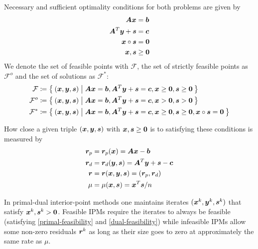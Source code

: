 Necessary and sufficient optimality conditions for both problems are given by
\begin{subequations} \label{optimality-conditions}
  \begin{align}
    \bm{A} \bm{x} &= \bm{b} \label{primal-feasibility} \\
    \bm{A}^T \bm{y} + \bm{s} &= \bm{c} \label{dual-feasibility} \\
    \bm{x} \circ \bm{s} &= \bm{0} \label{complementarity} \\
    \bm{x}, \bm{s} &\geq \bm{0} \label{nonnegativity}
  \end{align}
\end{subequations}
We denote the set of feasible points with \(\mathcal{F}\), the set of strictly feasible points as \(\mathcal{F}^o\) and the set of solutions as \(\mathcal{F}^*\):
\begin{align}
  \mathcal{F} &\coloneqq \Set{ (\bm{x}, \bm{y}, \bm{s}) | \bm{A}\bm{x} = \bm{b}, \bm{A}^T \bm{y} + \bm{s} = \bm{c}, \bm{x} \geq \bm{0}, \bm{s} \geq \bm{0}} \\
  \mathcal{F}^o &\coloneqq \Set{ (\bm{x}, \bm{y}, \bm{s}) | \bm{A}\bm{x} = \bm{b}, \bm{A}^T \bm{y} + \bm{s} = \bm{c}, \bm{x} > \bm{0}, \bm{s} > \bm{0}} \\
  \mathcal{F}^* &\coloneqq \Set{ (\bm{x}, \bm{y}, \bm{s}) | \bm{A}\bm{x} = \bm{b}, \bm{A}^T \bm{y} + \bm{s} = \bm{c}, \bm{x} \geq \bm{0}, \bm{s} \geq \bm{0}, \bm{x} \circ \bm{s} = \bm{0}}
\end{align}

How close a given triple \((\bm{x}, \bm{y}, \bm{s})\) with \(\bm{x}, \bm{s} \geq \bm{0}\) is to satisfying these conditions is measured by
\begin{subequations}
  \begin{align}
    \bm{r}_p &= \bm{r}_p(\bm{x}) = \bm{A}\bm{x} - \bm{b} \\
    \bm{r}_d &= \bm{r}_d(\bm{y}, \bm{s}) = \bm{A}^T \bm{y} + \bm{s} - \bm{c} \\
    \bm{r}   &= \bm{r}(\bm{x}, \bm{y}, \bm{s}) = (\bm{r}_p, \bm{r}_d) \\
    \mu       &= \mu(\bm{x}, \bm{s}) = \bm{x}^T \bm{s} / n
  \end{align}
\end{subequations}

In primal-dual interior-point methods one maintains iterates \((\bm{x}^k, \bm{y}^k, \bm{s}^k)\) that satisfy \(\bm{x}^k, \bm{s}^k > \bm{0}\).
Feasible IPMs require the iterates to always be feasible (satisfying \cref{primal-feasibility} and \cref{dual-feasibility}) while infeasible IPMs allow some non-zero residuals \(\bm{r}^k\) as long as their size goes to zero at approximately the same rate as \(\mu\).

